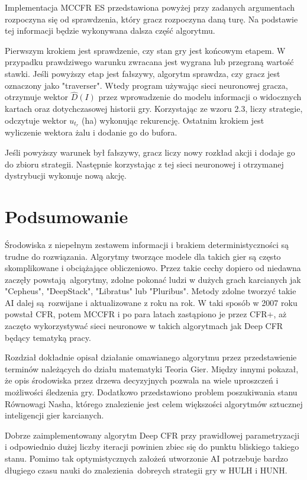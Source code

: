\documentclass[12pt,oneside,a4paper]{report}
\begin{document}
\vspace{1cm}

Implementacja MCCFR ES przedstawiona powyżej przy zadanych argumentach rozpoczyna się od
sprawdzenia, który gracz rozpoczyna daną turę. Na podstawie tej informacji będzie wykonywana
dalsza część algorytmu.


Pierwszym krokiem jest sprawdzenie, czy stan gry jest końcowym etapem. W przypadku prawdziwego 
warunku zwracana jest wygrana lub przegraną wartość stawki. 
Jeśli powyższy etap jest fałszywy, algorytm sprawdza, czy gracz jest oznaczony jako "traverser".
Wtedy program używając sieci neuronowej gracza,
otrzymuje wektor $\hat{D}(I)$ przez wprowadzenie do modelu informacji o widocznych kartach oraz
dotychczasowej historii gry. Korzystając ze wzoru 2.3, liczy strategie, odczytuje wektor $u_{t_{r}}$ (ha) 
wykonując rekurencję. Ostatnim krokiem jest wyliczenie wektora żalu i dodanie go do bufora.

Jeśli powyższy warunek był fałszywy, gracz liczy nowy rozkład
akcji i dodaje go do zbioru strategii. Następnie korzystając z tej sieci neuronowej i otrzymanej 
dystrybucji wykonuje nową akcję.


\section{Podsumowanie}

Środowiska z niepełnym zestawem informacji i brakiem deterministyczności są trudne do rozwiązania.
Algorytmy tworzące modele
dla takich gier są często skomplikowane i obciążające obliczeniowo. 
Przez takie cechy dopiero od niedawna zaczęły powstają algorytmy, zdolne pokonać ludzi w 
dużych grach karcianych jak "Cepheus", "DeepStack", "Libratus" lub "Pluribus". 
Metody zdolne tworzyć takie AI dalej są rozwijane i aktualizowane z roku na rok.
W taki sposób w 2007 roku powstał CFR, potem MCCFR i po para latach zastąpiono je przez CFR+, aż 
zaczęto wykorzystywać sieci neuronowe w takich algorytmach jak 
Deep CFR będący tematyką pracy. 

Rozdział dokładnie opisał działanie omawianego algorytmu
przez przedstawienie terminów należących do działu matematyki Teoria Gier. Między innymi
 pokazał, że opis środowiska przez drzewa decyzyjnych pozwala na wiele uproszczeń i możliwości
 śledzenia gry. Dodatkowo przedstawiono problem poszukiwania stanu Równowagi Nasha, którego
 znalezienie jest celem większości algorytmów sztucznej inteligencji gier karcianych.

Dobrze zaimplementowany algorytm Deep CFR przy prawidłowej parametryzacji i odpowiednio dużej
liczby iteracji powinien zbiec się do punktu bliskiego takiego stanu. Pomimo tak optymistycznych 
założeń utworzonie AI potrzebuje bardzo długiego czasu nauki do 
znalezienia dobreych strategii gry w HULH i HUNH.
\end{document}
